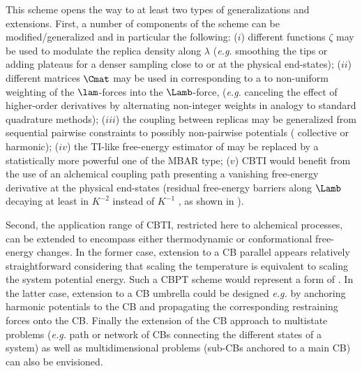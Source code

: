 %
%
%
This scheme opens the way to at least two types of generalizations and extensions.
%
%
%
%
First, a number of components of the scheme can be modified/generalized and in particular the following:
%
($i$) different functions $\zeta$ may be used 
      to modulate the replica density along $\lambda$ ({\em e.g.} smoothing the tips
      or adding plateaus\cite{BI14.1} for a denser sampling
      close to or at the physical end-states);
%
($ii$) different matrices $\Cmat$ may be used in  corresponding to
       a to non-uniform weighting of the $\lam$-forces into the $\Lamb$-force,
       ({\em e.g.} canceling the effect of higher-order
       derivatives by alternating non-integer weights in analogy to standard quadrature methods);
($iii$) the coupling between replicas may be generalized
        from sequential pairwise constraints to possibly non-pairwise potentials
        (\eg{} collective or harmonic);
($iv$) the TI-like free-energy estimator of  may be replaced by
          a statistically more powerful one of the MBAR
type\cite{LU04.3,SH05.6,SH08.7,FA09.4,TA12.1,DI17.5,ZH17.6};
($v$) CBTI would benefit from the use of an alchemical coupling path
          presenting a vanishing free-energy derivative at the physical end-states (residual free-energy 
          barriers along $\Lamb$ decaying at least in $K^{-2}$ instead of $K^{-1}$ , as shown in ).



Second, the application range of CBTI, restricted here to alchemical processes,
can be extended to encompass either thermodynamic or conformational free-energy 
changes.
%
In the former case, extension to a CB  parallel 
appears relatively straightforward considering that scaling the temperature
is equivalent to scaling the system potential energy. 
Such a 
CBPT scheme would represent a form of
 .
%
%
In the latter case, extension to a CB  umbrella 
could be designed {\em e.g.} by anchoring harmonic potentials to the CB
and propagating the corresponding restraining forces onto the CB.
%
Finally the extension of the CB approach to multistate problems\cite{KN11.2,BI15.2,HA17.1,VI18.2} 
({\em e.g.} path or network of CBs connecting the different states of a system)
as well as multidimensional problems (sub-CBs anchored to a main CB) can also
be envisioned.

